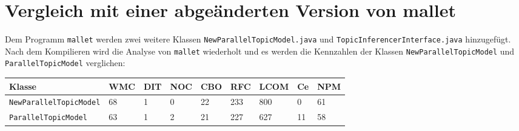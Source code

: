 \documentclass{scrreprt}
\newcommand{\lstx}[1]{\lstinline$#1$}
\begin{document}
\pagebreak

\section{Vergleich mit einer abgeänderten Version von mallet}

Dem Programm \lstx{mallet} werden zwei weitere Klassen \lstx{NewParallelTopicModel.java} und \lstx{TopicInferencerInterface.java} hinzugefügt. Nach dem Kompilieren wird die Analyse von \lstx{mallet} wiederholt und es werden die Kennzahlen der Klassen \lstx{NewParallelTopicModel} und \lstx{ParallelTopicModel} verglichen:



\begin{tabular}{lllllllll}
\toprule
Klasse & WMC & DIT & NOC & CBO & RFC & LCOM & Ce & NPM \\
\midrule
\lstx{NewParallelTopicModel} & 68 & 1 & 0 & 22 & 233 & 800 & 0 & 61 \\
\lstx{ParallelTopicModel} & 63 & 1 & 2 & 21 & 227 & 627 & 11 & 58 \\
\bottomrule
\end{tabular}
\end{document}
